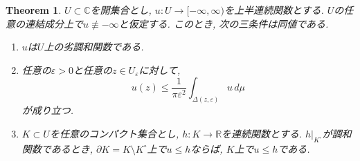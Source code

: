 \documentclass[dvipdfmx,a4paper,11pt]{report} %
\newtheorem{thm}{Theorem}[section]
\theoremstyle{definition}
\theoremstyle{remark}
\numberwithin{equation}{section}
\newcommand{\R}{\mathbb{R}}
\newcommand{\C}{\mathbb{C}}
\begin{document}
\begin{tcolorbox}[mybox]
\begin{thm}
$U \subset \C$を開集合とし,
$u \colon U \to [-\infty,\infty)$を上半連続関数とする.
$U$の任意の連結成分上で$u \not\equiv -\infty$と仮定する.
このとき, 次の三条件は同値である.

\begin{enumerate}[label=(\roman*)]
\item
$u$は$U$上の劣調和関数である.

\item
任意の$\varepsilon > 0$と任意の$z \in U_\varepsilon$に対して,
\[
u(z)
\leq
\frac{1}{\pi\varepsilon^2}
\int_{\Delta(z,\varepsilon)} u\,d\mu
\]
が成り立つ.

\item
$K \subset U$を任意のコンパクト集合とし,
$h \colon K \to \R$を連続関数とする.
$h|_{K^\circ}$が調和関数であるとき,
$\partial K=K\setminus K^\circ$上で$u \leq h$ならば,
$K$上で$u \leq h$である.
\end{enumerate}
\end{thm}
\end{tcolorbox}
\end{document}
